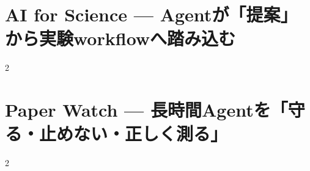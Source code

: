 \documentclass[lualatex,a4paper,11pt]{jlreq}
\begin{document}
\Needspace{0.45\textheight}
\bigskip
\section{AI for Science — Agentが「提案」から実験workflowへ踏み込む}
\label{pkg:ai-for-science-june}
\vspace{0.15em}
\begin{multicols}{2}

\end{multicols}
\Needspace{0.34\textheight}

\medskip


\Needspace{0.45\textheight}
\bigskip
\section{Paper Watch — 長時間Agentを「守る・止めない・正しく測る」}
\label{pkg:paper-watch-june}
\vspace{0.15em}
\begin{multicols}{2}

\end{multicols}


\Needspace{0.55\textheight}
\bigskip

\bigskip
\printbibliography[title={References / Source Notes}]
\end{document}
